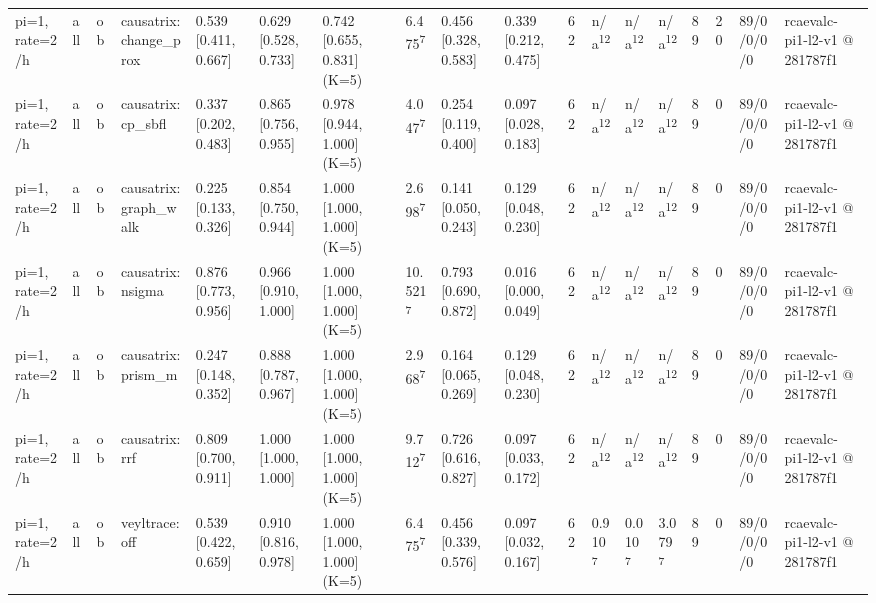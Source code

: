 \begin{table}[t]
\begin{tabular}{llllllllllllllllll}
pi=1, rate=2/h & all & ob & causatrix:change\_prox & 0.539 [0.411, 0.667] & 0.629 [0.528, 0.733] & 0.742 [0.655, 0.831] (K=5) & 6.475\textsuperscript{7} & 0.456 [0.328, 0.583] & 0.339 [0.212, 0.475] & 62 & n/a\textsuperscript{12} & n/a\textsuperscript{12} & n/a\textsuperscript{12} & 89 & 20 & 89/0/0/0/0 & rcaevalc-pi1-l2-v1 @ 281787f1 \\
pi=1, rate=2/h & all & ob & causatrix:cp\_sbfl & 0.337 [0.202, 0.483] & 0.865 [0.756, 0.955] & 0.978 [0.944, 1.000] (K=5) & 4.047\textsuperscript{7} & 0.254 [0.119, 0.400] & 0.097 [0.028, 0.183] & 62 & n/a\textsuperscript{12} & n/a\textsuperscript{12} & n/a\textsuperscript{12} & 89 & 0 & 89/0/0/0/0 & rcaevalc-pi1-l2-v1 @ 281787f1 \\
pi=1, rate=2/h & all & ob & causatrix:graph\_walk & 0.225 [0.133, 0.326] & 0.854 [0.750, 0.944] & 1.000 [1.000, 1.000] (K=5) & 2.698\textsuperscript{7} & 0.141 [0.050, 0.243] & 0.129 [0.048, 0.230] & 62 & n/a\textsuperscript{12} & n/a\textsuperscript{12} & n/a\textsuperscript{12} & 89 & 0 & 89/0/0/0/0 & rcaevalc-pi1-l2-v1 @ 281787f1 \\
pi=1, rate=2/h & all & ob & causatrix:nsigma & 0.876 [0.773, 0.956] & 0.966 [0.910, 1.000] & 1.000 [1.000, 1.000] (K=5) & 10.521\textsuperscript{7} & 0.793 [0.690, 0.872] & 0.016 [0.000, 0.049] & 62 & n/a\textsuperscript{12} & n/a\textsuperscript{12} & n/a\textsuperscript{12} & 89 & 0 & 89/0/0/0/0 & rcaevalc-pi1-l2-v1 @ 281787f1 \\
pi=1, rate=2/h & all & ob & causatrix:prism\_m & 0.247 [0.148, 0.352] & 0.888 [0.787, 0.967] & 1.000 [1.000, 1.000] (K=5) & 2.968\textsuperscript{7} & 0.164 [0.065, 0.269] & 0.129 [0.048, 0.230] & 62 & n/a\textsuperscript{12} & n/a\textsuperscript{12} & n/a\textsuperscript{12} & 89 & 0 & 89/0/0/0/0 & rcaevalc-pi1-l2-v1 @ 281787f1 \\
pi=1, rate=2/h & all & ob & causatrix:rrf & 0.809 [0.700, 0.911] & 1.000 [1.000, 1.000] & 1.000 [1.000, 1.000] (K=5) & 9.712\textsuperscript{7} & 0.726 [0.616, 0.827] & 0.097 [0.033, 0.172] & 62 & n/a\textsuperscript{12} & n/a\textsuperscript{12} & n/a\textsuperscript{12} & 89 & 0 & 89/0/0/0/0 & rcaevalc-pi1-l2-v1 @ 281787f1 \\
pi=1, rate=2/h & all & ob & veyltrace:off & 0.539 [0.422, 0.659] & 0.910 [0.816, 0.978] & 1.000 [1.000, 1.000] (K=5) & 6.475\textsuperscript{7} & 0.456 [0.339, 0.576] & 0.097 [0.032, 0.167] & 62 & 0.910\textsuperscript{7} & 0.010\textsuperscript{7} & 3.079\textsuperscript{7} & 89 & 0 & 89/0/0/0/0 & rcaevalc-pi1-l2-v1 @ 281787f1 \\

\end{tabular}
\end{table}
